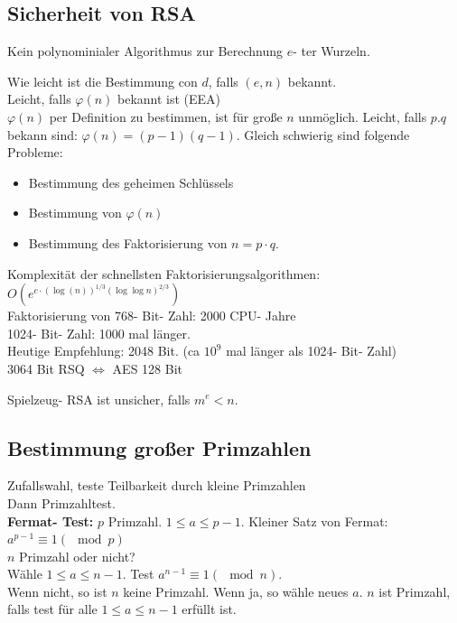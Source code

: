  \subsection{Sicherheit von RSA}
      \item Kein polynominialer Algorithmus zur Berechnung $e$- ter Wurzeln.
      \item Wie leicht ist die Bestimmung con $d$, falls $(e,n)$ bekannt.\\
        Leicht, falls $\varphi(n)$ bekannt ist (EEA)\\
        $\varphi(n)$ per Definition zu bestimmen, ist für große $n$ unmöglich.
        Leicht, falls $p.q$ bekann sind: $\varphi(n)=(p-1)(q-1)$. Gleich
        schwierig sind folgende Probleme:
        \begin{itemize}
          \item Bestimmung des geheimen Schlüssels
          \item Bestimmung von $\varphi(n)$\\
          \item Bestimmung des Faktorisierung von $n=p\cdot q$.
        \end{itemize}
      \item Komplexität der schnellsten Faktorisierungsalgorithmen:
        $O(e^{c\cdot(\log(n))^{1/3}(\log\log n)^{2/3}})$\\
        Faktorisierung von 768- Bit- Zahl: 2000 CPU- Jahre\\
        1024- Bit- Zahl: 1000 mal länger.\\
        Heutige Empfehlung: 2048 Bit. (ca $10^9$ mal länger als 1024- Bit-
        Zahl)\\
        3064 Bit RSQ $\Leftrightarrow$ AES 128 Bit
      \item Spielzeug- RSA ist unsicher, falls $m^e<n$.
    \subExEnd

  \subsection{Bestimmung großer Primzahlen}
    Zufallswahl, teste Teilbarkeit durch kleine Primzahlen\\
    Dann Primzahltest.\\
    \textbf{Fermat- Test:} $p$ Primzahl. $1\leq a\leq p-1$. Kleiner Satz von
    Fermat: $a^{p-1}\equiv 1(\mod p)$\\
    $n$ Primzahl oder nicht?\\
    Wähle $1\leq a\leq n-1$. Test $a^{n-1}\equiv 1(\mod n)$.\\
    Wenn nicht, so ist $n$ keine Primzahl. Wenn ja, so wähle neues $a$. $n$ ist
    Primzahl, falls test für alle $1\leq a\leq n-1$ erfüllt ist.

